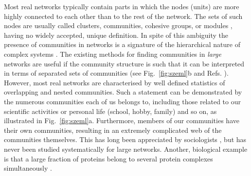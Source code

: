 \documentclass[11pt,a4paper]{article}
\begin{document}
Most real
networks typically contain parts in which the nodes
(units) are more highly connected to each other than
to the rest of the network. The sets of such nodes are usually called
clusters, communities, cohesive groups, or modules
\cite{scott-book,pnas-suppl,everitt-book,knudsen-book,newman-europhys},
having no widely accepted, unique definition.
In spite of this ambiguity
the presence of communities in networks is a
signature of the hierarchical nature of complex systems
\cite{ravasz-science,vicsek-nature}.
The existing methods for finding communities in \emph{large}
networks are useful if the community structure is such that it can be
interpreted in terms of separated sets of communities (see
Fig.~\ref{fig:szeml}b and Refs.
\cite{pnas-suppl,domany-prl,gn-pnas,radicchi-pnas,newman-pre}).
However, most real networks are
characterised by well defined statistics of overlapping and nested
communities. Such a statement can be demonstrated by the
numerous communities each of us belongs to, including those related to
our scientific activities
or personal life (school, hobby, family) and so on, as illustrated in
Fig.~\ref{fig:szeml}a. Furthermore, members of our communities have
their own communities, resulting in an extremely complicated web of the
communities themselves. This has long been appreciated by sociologists
\cite{wasserman},
but has never been studied systematically for large networks.
Another, biological example is that a large fraction of proteins belong
to several protein complexes simultaneously
\cite{protein-complexes}.
\end{document}
